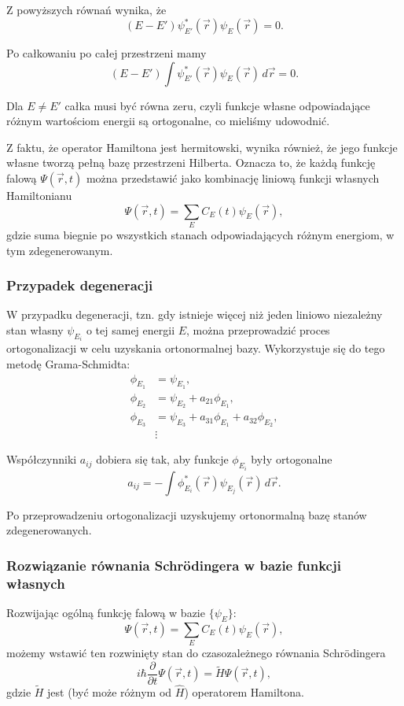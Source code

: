 Z powyższych równań wynika, że
$$
(E - E') \psi_{E'}^*(\vec{r}) \psi_E(\vec{r}) = 0.
$$

Po całkowaniu po całej przestrzeni mamy
$$
(E - E') \int \psi_{E'}^*(\vec{r}) \psi_E(\vec{r}) \, d\vec{r} = 0.
$$

Dla $E \ne E'$ całka musi być równa zeru, czyli funkcje własne odpowiadające różnym wartościom energii są ortogonalne, co mieliśmy udowodnić.

Z faktu, że operator Hamiltona jest hermitowski, wynika również, że jego funkcje własne tworzą pełną bazę przestrzeni Hilberta. Oznacza to, że każdą funkcję falową $\Psi(\vec{r}, t)$ można przedstawić jako kombinację liniową funkcji własnych Hamiltonianu
$$
\Psi(\vec{r}, t) = \sum_E C_E(t) \psi_E(\vec{r}),
$$
gdzie suma biegnie po wszystkich stanach odpowiadających różnym energiom, w tym zdegenerowanym.

\subsubsection*{Przypadek degeneracji}

W przypadku degeneracji, tzn. gdy istnieje więcej niż jeden liniowo niezależny stan własny $\psi_{E_i}$ o tej samej energii $E$, można przeprowadzić proces ortogonalizacji w celu uzyskania ortonormalnej bazy. Wykorzystuje się do tego metodę Grama-Schmidta:
\begin{align*}
\phi_{E_1} &= \psi_{E_1}, \\
\phi_{E_2} &= \psi_{E_2} + a_{21} \phi_{E_1}, \\
\phi_{E_3} &= \psi_{E_3} + a_{31} \phi_{E_1} + a_{32} \phi_{E_2}, \\
&\vdots
\end{align*}

Współczynniki $a_{ij}$ dobiera się tak, aby funkcje $\phi_{E_i}$ były ortogonalne
$$
a_{ij} = -\int \phi_{E_i}^*(\vec{r}) \psi_{E_j}(\vec{r}) \, d\vec{r}.
$$

Po przeprowadzeniu ortogonalizacji uzyskujemy ortonormalną bazę stanów zdegenerowanych.

\subsubsection*{Rozwiązanie równania Schrödingera w bazie funkcji własnych}

Rozwijając ogólną funkcję falową w bazie $\{ \psi_E \}$:
$$
\Psi(\vec{r}, t) = \sum_E C_E(t) \psi_E(\vec{r}),
$$
możemy wstawić ten rozwinięty stan do czasozależnego równania Schrödingera
$$
i\hbar \frac{\partial}{\partial t} \Psi(\vec{r}, t) = \tilde{H} \Psi(\vec{r}, t),
$$
gdzie $\tilde{H}$ jest (być może różnym od $\hat{H}$) operatorem Hamiltona.

